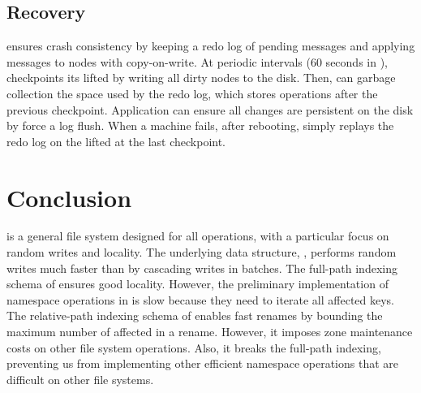 \subsection{Recovery}
\label{sec:bg:impl:recover}

\Fti ensures crash consistency by keeping a redo log of pending messages and
applying messages to \betrfs nodes with copy-on-write.
At periodic intervals (60 seconds in \betrfs), \fti checkpoints its lifted
\bets by writing all dirty nodes to the disk.
Then, \fti can garbage collection the space used by the redo log,
which stores operations after the previous checkpoint.
Application can ensure all changes are persistent on the disk by force a log
flush.
When a machine fails, after rebooting, \fti simply replays the redo log on the
lifted \bets at the last checkpoint.

\section{Conclusion}

\betrfs is a general file system designed for all operations, with a particular
focus on random writes and locality.
The underlying data structure, \bets, performs random writes much faster than
\btrees by cascading writes in batches.
The full-path indexing schema of \betrfsOne ensures good locality.
However, the preliminary implementation of namespace operations in \betrfsOne
is slow because they need to iterate all affected keys.
The relative-path indexing schema of \betrfsTwo enables fast renames by bounding
the maximum number of affected in a rename.
However, it imposes zone maintenance costs on other file system operations.
Also, it breaks the full-path indexing, preventing us from implementing other
efficient namespace operations that are difficult on other file systems.

